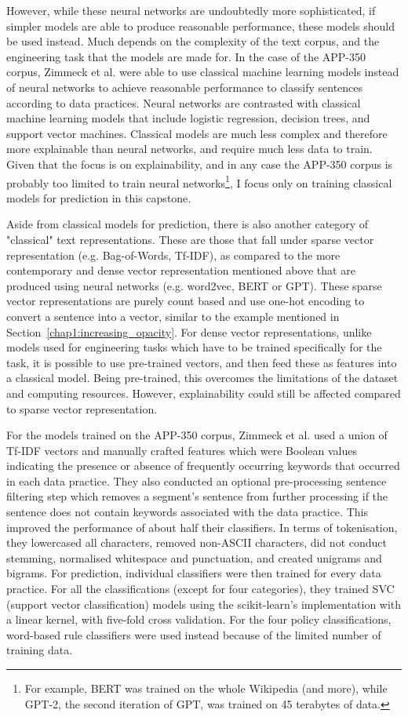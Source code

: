 However, while these neural networks are undoubtedly more sophisticated, if simpler models are able to produce reasonable performance, these models should be used instead. Much depends on the complexity of the text corpus, and the engineering task that the models are made for. In the case of the APP-350 corpus, Zimmeck et al. were able to use classical machine learning models instead of neural networks to achieve reasonable performance to classify sentences according to data practices. Neural networks are contrasted with classical machine learning models that include logistic regression, decision trees, and support vector machines. Classical models are much less complex and therefore more explainable than neural networks, and require much less data to train. Given that the focus is on explainability, and in any case the APP-350 corpus is probably too limited to train neural networks\footnote{For example, BERT was trained on the whole Wikipedia (and more), while GPT-2, the second iteration of GPT, was trained on 45 terabytes of data.}, I focus only on training classical models for prediction in this capstone.

Aside from classical models for prediction, there is also another category of "classical" text representations. These are those that fall under sparse vector representation (e.g. Bag-of-Words, Tf-IDF), as compared to the more contemporary and dense vector representation mentioned above that are produced using neural networks (e.g. word2vec, BERT or GPT). These sparse vector representations are purely count based and use one-hot encoding to convert a sentence into a vector, similar to the example mentioned in Section~\ref{chap1:increasing_opacity}. For dense vector representations, unlike models used for engineering tasks which have to be trained specifically for the task, it is possible to use pre-trained vectors, and then feed these as features into a classical model. Being pre-trained, this overcomes the limitations of the dataset and computing resources. However, explainability could still be affected compared to sparse vector representation.

For the models trained on the APP-350 corpus, Zimmeck et al. used a union of Tf-IDF vectors and manually crafted features which were Boolean values indicating the presence or absence of frequently occurring keywords that occurred in each data practice. They also conducted an optional pre-processing sentence filtering step which removes a segment's sentence from further processing if the sentence does not contain keywords associated with the data practice. This improved the performance of about half their classifiers. In terms of tokenisation, they lowercased all characters, removed non-ASCII characters, did not conduct stemming, normalised whitespace and punctuation, and created unigrams and bigrams. For prediction, individual classifiers were then trained for every data practice. For all the classifications (except for four categories), they trained SVC (support vector classification) models using the scikit-learn's implementation with a linear kernel, with five-fold cross validation. For the four policy classifications, word-based rule classifiers were used instead because of the limited number of training data.

